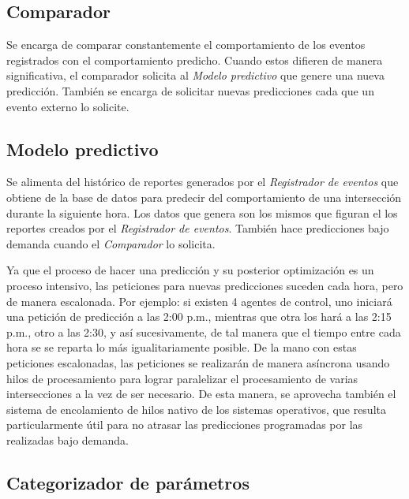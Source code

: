 \hypertarget{comparador}{%
\subsection{Comparador}\label{comparador}}

Se encarga de comparar constantemente el comportamiento de los eventos
registrados con el comportamiento predicho. Cuando estos difieren de
manera significativa, el comparador solicita al \emph{Modelo predictivo}
que genere una nueva predicción. También se encarga de solicitar nuevas
predicciones cada que un evento externo lo solicite.

\hypertarget{modelo-predictivo}{%
\subsection{Modelo predictivo}\label{modelo-predictivo}}

Se alimenta del histórico de reportes generados por el \emph{Registrador
de eventos} que obtiene de la base de datos para predecir del
comportamiento de una intersección durante la siguiente hora. Los datos
que genera son los mismos que figuran el los reportes creados por el
\emph{Registrador de eventos}. También hace predicciones bajo demanda
cuando el \emph{Comparador} lo solicita.

Ya que el proceso de hacer una predicción y su posterior optimización es
un proceso intensivo, las peticiones para nuevas predicciones suceden
cada hora, pero de manera escalonada. Por ejemplo: si existen 4 agentes
de control, uno iniciará una petición de predicción a las 2:00 p.m.,
mientras que otra los hará a las 2:15 p.m., otro a las 2:30, y así
sucesivamente, de tal manera que el tiempo entre cada hora se se reparta
lo más igualitariamente posible. De la mano con estas peticiones
escalonadas, las peticiones se realizarán de manera asíncrona usando
hilos de procesamiento para lograr paralelizar el procesamiento de
varias intersecciones a la vez de ser necesario. De esta manera, se
aprovecha también el sistema de encolamiento de hilos nativo de los
sistemas operativos, que resulta particularmente útil para no atrasar
las predicciones programadas por las realizadas bajo demanda.

\hypertarget{categorizador-de-paruxe1metros}{%
\subsection{Categorizador de
parámetros}\label{categorizador-de-paruxe1metros}}

